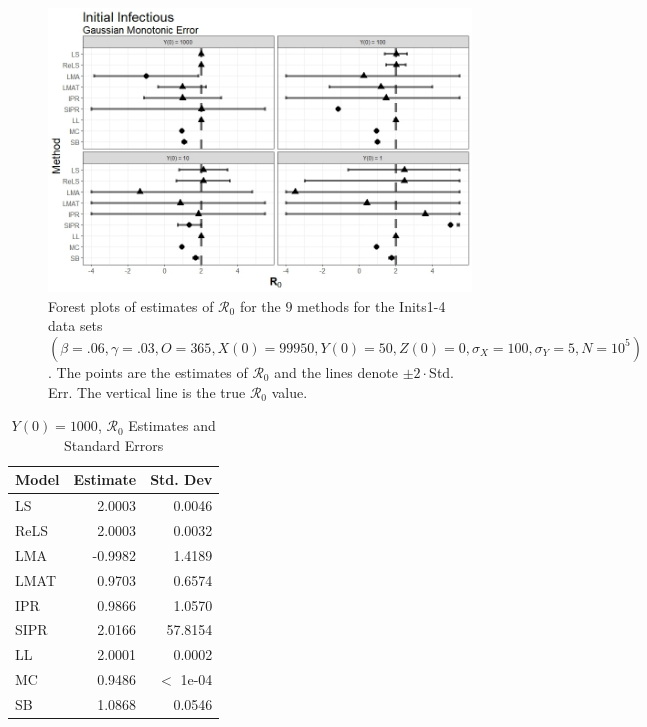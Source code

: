 \documentclass[12pt]{article}
\newcommand{\xxsir}{\ensuremath{9} } %
\newcommand{\rr}{\ensuremath{\mathcal{R}_0}}
\begin{document}
\begin{figure}[H]
	\centering
	\includegraphics[scale=0.5]{images/start_nm.jpeg}
	\caption{Forest plots of estimates of $\rr$ for the \xxsir methods for the Inits1-4 data sets $(\beta=.06, \gamma=.03, O=365, X(0)=99950, Y(0)=50, Z(0)=0, \sigma_X=100, \sigma_Y=5, N=10^5)$.  The points are the estimates of $\rr$ and the lines denote $\pm 2\cdot $Std. Err.  The vertical line is the true $\rr$ value.}
\end{figure}


\begin{table}[H]
	
	\centering
	\begin{tabular}[t]{l|r|r}
		\hline
		Model & Estimate & Std. Dev\\
		\hline
		LS & 2.0003 & 0.0046\\
		\hline
		ReLS & 2.0003 & 0.0032\\
		\hline
		LMA & -0.9982 & 1.4189\\
		\hline
		LMAT & 0.9703 & 0.6574\\
		\hline
		IPR & 0.9866 & 1.0570\\
		\hline
		SIPR & 2.0166 & 57.8154\\
		\hline
		LL & 2.0001 & 0.0002\\
		\hline
		MC & 0.9486 & $<$ 1e-04\\
		\hline
		SB & 1.0868 & 0.0546\\
		\hline
	\end{tabular}
	\caption{$Y(0) = 1000$, $\rr$ Estimates and Standard Errors}
\end{table}
\end{document}
